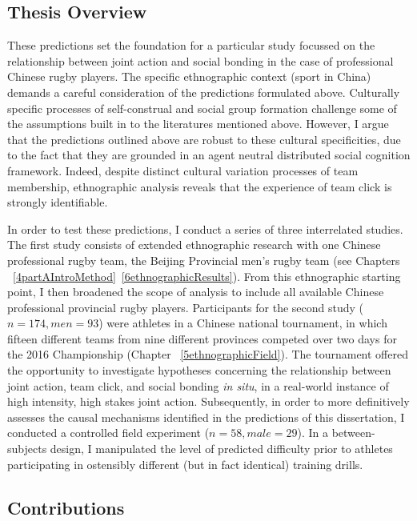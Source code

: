 \begin{CJK}{UTF8}{gbsn}
\section{Thesis Overview}

These predictions set the foundation for a particular study focussed on the relationship between joint action and social bonding in the case of professional Chinese rugby players. The specific ethnographic context (sport in China) demands a careful consideration of the predictions formulated above.  Culturally specific processes of self-construal and social group formation challenge some of the assumptions built in to the literatures mentioned above.  However, I argue that the predictions outlined above are robust to these cultural specificities, due to the fact that they are grounded in an agent neutral distributed social cognition framework. Indeed, despite distinct cultural variation processes of team membership, ethnographic analysis reveals that the experience of team click is strongly identifiable.

In order to test these predictions, I conduct a series of three interrelated studies.  The first study consists of extended ethnographic research with one Chinese professional rugby team, the Beijing Provincial men's rugby team (see Chapters ~\ref{4partAIntroMethod}\nobreakdash~\ref{6ethnographicResults}). From this ethnographic starting point, I then broadened the scope of analysis to include all available Chinese professional provincial rugby players. Participants for the second study ($n = 174, men = 93$) were athletes in a Chinese national tournament, in which fifteen different teams from nine different provinces competed over two days for the 2016 Championship (Chapter ~\ref{5ethnographicField}).  The tournament offered the opportunity to investigate hypotheses concerning the relationship between joint action, team click, and social bonding \textit{in situ}, in a real-world instance of high intensity, high stakes joint action.  Subsequently, in order to more definitively assesses the causal mechanisms identified in the predictions of this dissertation, I conducted a controlled field experiment ($n = 58, male = 29$). In a between-subjects design, I manipulated the level of predicted difficulty prior to athletes participating in ostensibly different (but in fact identical) training drills.

\subsection{Contributions}





\end{CJK}
